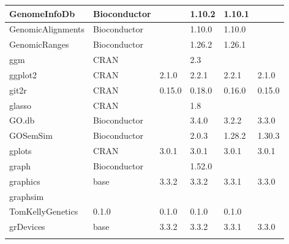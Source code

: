 \begin{longtable}{|llllll|}
GenomeInfoDb                  & Bioconductor              &             & 1.10.2      & 1.10.1         &                  \\ \hline
GenomicAlignments             & Bioconductor              &             & 1.10.0      & 1.10.0         &                   \\ \hline \rowcolor{gray!25}
GenomicRanges                 & Bioconductor              &             & 1.26.2      & 1.26.1         &                  \\ \hline
ggm                           & CRAN                      &             & 2.3         &                &                   \\ \hline \rowcolor{gray!25}
ggplot2                       & CRAN                      & 2.1.0       & 2.2.1       & 2.2.1          & 2.1.0            \\ \hline
git2r                         & CRAN                      & 0.15.0      & 0.18.0      & 0.16.0         & 0.15.0            \\ \hline \rowcolor{gray!25}
glasso                        & CRAN                      &             & 1.8         &                &                  \\ \hline
GO.db                         & Bioconductor              &             & 3.4.0       & 3.2.2          & 3.3.0             \\ \hline \rowcolor{gray!25}
GOSemSim                      & Bioconductor              &             & 2.0.3       & 1.28.2         & 1.30.3           \\ \hline
gplots                        & CRAN                      & 3.0.1       & 3.0.1       & 3.0.1          & 3.0.1             \\ \hline \rowcolor{gray!25}
graph                         & Bioconductor              &             & 1.52.0      &                &                  \\ \hline
graphics                      & base                      & 3.3.2       & 3.3.2       & 3.3.1          & 3.3.0             \\ \hline \rowcolor{gray!25}
graphsim                      & \begin{tabular}[c]{@{}l@{}}GitHub \\ TomKellyGenetics \end{tabular}  & 0.1.0       & 0.1.0       & 0.1.0          & 0.1.0            \\ \hline
grDevices                     & base                      & 3.3.2       & 3.3.2       & 3.3.1          & 3.3.0             \\ \hline \rowcolor{gray!25}

\end{longtable}
